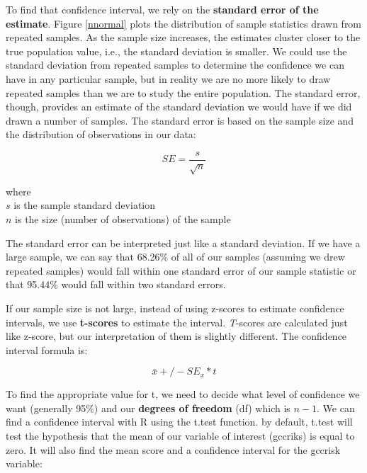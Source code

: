 \documentclass[11pt,openany]{book}\usepackage[]{graphicx}\usepackage[]{color}
\begin{document}
{To find that confidence interval, we rely on the \textbf{standard error of the estimate}.   Figure \ref{nnormal} plots the distribution of sample statistics drawn from repeated samples.   As the sample size increases, the estimates cluster closer to the true population value, i.e., the standard deviation is smaller.  We could use the standard deviation from repeated samples to determine the confidence we can have in any particular sample, but in reality we are no more likely to draw repeated samples than we are to study the entire population.  The standard error, though, provides an estimate of the standard deviation we would have if we did drawn a number of samples.  The standard error is based on the sample size and the distribution of observations in our data:

\begin{equation}
  \label{ch5_eq_label1}
  SE = \frac{s}{\sqrt{n}}
\end{equation}

\noindent where\\
    $s$ is the sample standard deviation\\
    $n$ is the size (number of observations) of the sample

The standard error can be interpreted just like a standard deviation.   If we have a large sample, we can say that 68.26\% of all of our samples (assuming we drew repeated samples) would fall within one standard error of our sample statistic or that 95.44\% would fall within two standard errors.  

If our sample size is not large, instead of using z-scores to estimate confidence intervals, we use \textbf{t-scores} to estimate the interval.   \textit{T}-scores are calculated just like z-score, but our interpretation of them is slightly different. The confidence interval formula is:

\begin{equation}
  \label{ch5_eq_label2}
  \bar{x}+/- SE_x * t
\end{equation}

To find the appropriate value for t, we need to decide what level of confidence we want (generally 95\%) and our \textbf{degrees of freedom} (df) which is $n - 1$.  We can find a confidence interval with R using the t.test function.  by default, t.test will test the hypothesis that the mean of our variable of interest (gccriks) is equal to zero.  It will also find the mean score and a confidence interval for the gccrisk variable:\\

}
\end{document}
